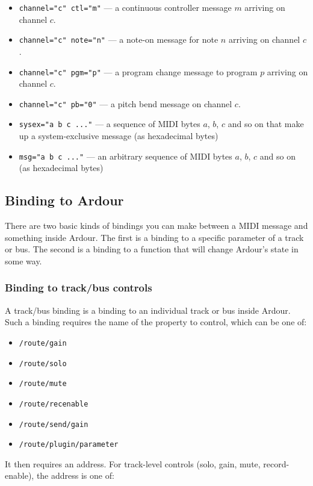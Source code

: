 \documentclass[10pt,a4paper]{book}
\begin{document}
{\begin{itemize}
\item \texttt{channel="c" ctl="m"} --- a continuous controller message $m$ arriving on channel $c$.
\item \texttt{channel="c" note="n"} --- a note-on message for note $n$ arriving on channel $c$.
\item \texttt{channel="c" pgm="p"} --- a program change message to program $p$ arriving on channel $c$.
\item \texttt{channel="c" pb="0"} --- a pitch bend message on channel $c$.
\item \texttt{sysex="a b c ..."} --- a sequence of MIDI bytes $a$, $b$, $c$ and so on that make up a system-exclusive message (as hexadecimal bytes)
\item \texttt{msg="a b c ..."} --- an arbitrary sequence of MIDI bytes $a$, $b$, $c$ and so on (as hexadecimal bytes)
\end{itemize}

\subsection{Binding to Ardour}

There are two basic kinds of bindings you can make between a MIDI
message and something inside Ardour. The first is a binding to a
specific parameter of a track or bus. The second is a binding to a
function that will change Ardour's state in some way. 


\subsubsection{Binding to track/bus controls}

A track/bus binding is a binding to an individual track or bus inside
Ardour.  Such a binding requires the name of the property to control,
which can be one of:

\begin{itemize}
\item \texttt{/route/gain}
\item \texttt{/route/solo}
\item \texttt{/route/mute}
\item \texttt{/route/recenable}
\item \texttt{/route/send/gain}
\item \texttt{/route/plugin/parameter}
\end{itemize}

It then requires an address.  For track-level controls (solo, gain, mute, record-enable), the address is one of:

}
\end{document}
